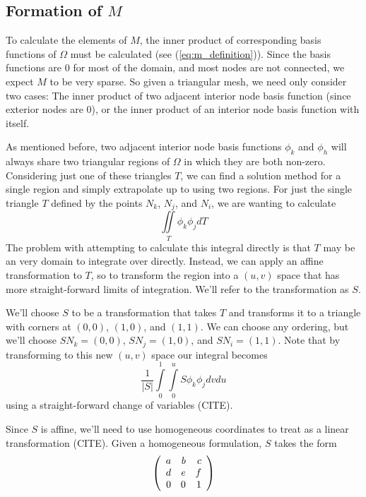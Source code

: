 \subsection{Formation of $M$}
To calculate the elements of $M$, the inner product of corresponding basis functions of $\Omega$ must be calculated
(see (\ref{eq:m_definition})). Since the basis functions are 0 for most of the domain, and most nodes are not
connected, we expect $M$ to be very sparse. So given a triangular mesh, we need only consider two cases: The inner
product of two adjacent interior node basis function (since exterior nodes are 0), or the inner product of an interior
node basis function with itself.

As mentioned before, two adjacent interior node basis functions $\phi_k$ and $\phi_h$ will always share two triangular
regions of $\Omega$ in which they are both non-zero. Considering just one of these triangles $T$, we can find a solution method for a
single region and simply extrapolate up to using two regions. For just the single triangle $T$ defined by the points
$N_k$, $N_j$, and $N_i$, we are wanting to calculate
\begin{equation}
\iint\limits_T \phi_k \phi_j dT
\end{equation}
The problem with attempting to calculate this integral directly is that $T$ may be an very domain to integrate over
directly. Instead, we can apply an affine transformation to $T$, so to transform the region into a $(u,v)$ space that
has more straight-forward limits of integration. We'll refer to the transformation as $S$.

We'll choose $S$ to be a transformation that takes $T$ and transforms it to a triangle with corners at $(0,0)$, $(1,0)$,
and $(1,1)$. We can choose any ordering, but we'll choose $SN_k = (0, 0)$, $SN_j = (1, 0)$, and $SN_i = (1, 1)$. Note that
by transforming to this new $(u,v)$ space our integral becomes
\begin{equation}
\frac{1}{|S|} \int\limits_0^1 \int\limits_0^u S \phi_k \phi_j dv du
\end{equation}
using a straight-forward change of variables (CITE).

Since $S$ is affine, we'll need to use homogeneous coordinates to treat as a linear transformation (CITE). Given a homogeneous
formulation, $S$ takes the form
\begin{equation}
\left(\begin{array}{rrrrrr}  a & b & c \\ d & e & f \\ 0 & 0 & 1  \\ \end{array} \right)
\end{equation}

